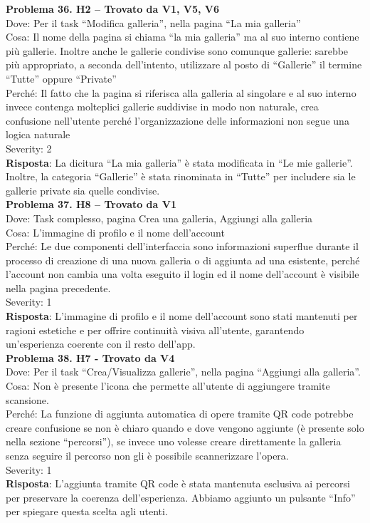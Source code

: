 \documentclass{article}
\begin{document}
\noindent \textbf{Problema 36. H2 – Trovato da V1, V5, V6} \\
Dove: Per il task “Modifica galleria”, nella pagina “La mia galleria” \\
Cosa: Il nome della pagina si chiama “la mia galleria” ma al suo interno contiene più gallerie. Inoltre anche le gallerie condivise sono comunque gallerie: sarebbe più appropriato, a seconda dell’intento, utilizzare al posto di “Gallerie” il termine “Tutte” oppure “Private” \\
Perché: Il fatto che la pagina si riferisca alla galleria al singolare e al suo interno invece contenga molteplici gallerie suddivise in modo non naturale, crea confusione nell’utente perché l’organizzazione delle informazioni non segue una logica naturale \\
Severity: 2 \\
\textbf{Risposta}: La dicitura “La mia galleria” è stata modificata in “Le mie gallerie”. Inoltre, la categoria “Gallerie” è stata rinominata in “Tutte” per includere sia le gallerie private sia quelle condivise.\\

\noindent \textbf{Problema 37. H8 – Trovato da V1} \\
Dove: Task complesso, pagina Crea una galleria, Aggiungi alla galleria \\
Cosa: L’immagine di profilo e il nome dell’account \\
Perché: Le due componenti dell’interfaccia sono informazioni superflue durante il processo di creazione di una nuova galleria o di aggiunta ad una esistente, perché l’account non cambia una volta eseguito il login ed il nome dell'account è visibile nella pagina precedente. \\
Severity: 1 \\
\textbf{Risposta}: L’immagine di profilo e il nome dell’account sono stati mantenuti per ragioni estetiche e per offrire continuità visiva all’utente, garantendo un’esperienza coerente con il resto dell’app.\\

\noindent \textbf{Problema 38. H7 - Trovato da V4} \\
Dove: Per il task “Crea/Visualizza gallerie”, nella pagina “Aggiungi alla galleria”. \\
Cosa: Non è presente l’icona che permette all’utente di aggiungere tramite scansione. \\
Perché: La funzione di aggiunta automatica di opere tramite QR code potrebbe creare confusione se non è chiaro quando e dove vengono aggiunte (è presente solo nella sezione “percorsi”), se invece uno volesse creare direttamente la galleria senza seguire il percorso non gli è possibile scannerizzare l’opera. \\
Severity: 1 \\
\textbf{Risposta}: L’aggiunta tramite QR code è stata mantenuta esclusiva ai percorsi per preservare la coerenza dell’esperienza. Abbiamo aggiunto un pulsante “Info” per spiegare questa scelta agli utenti. \\
\end{document}
